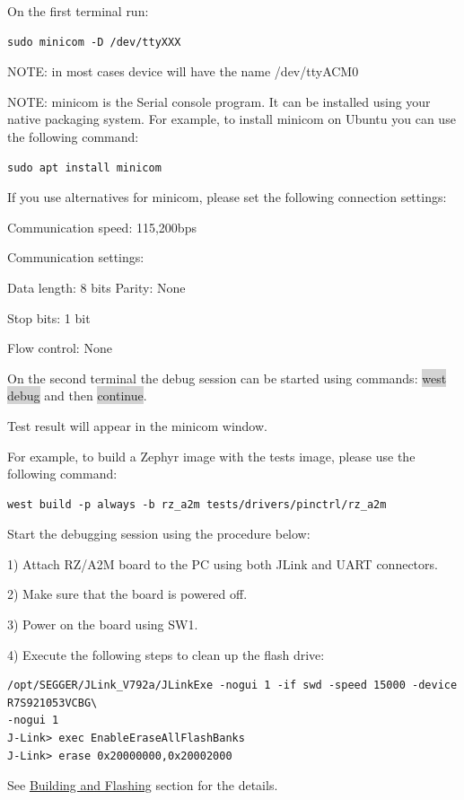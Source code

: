 \documentclass[11pt,a4paper,oneside]{article}
\begin{document}
On the first terminal run:
\begin{lstlisting}
sudo minicom -D /dev/ttyXXX
\end{lstlisting}

NOTE: in most cases device will have the name /dev/ttyACM0

NOTE: minicom is the Serial console program. It can be installed using
your native packaging system. For example, to install minicom on Ubuntu
you can use the following command:

\begin{lstlisting}
sudo apt install minicom
\end{lstlisting}

If you use alternatives for minicom, please set the following connection
settings:

Communication speed: 115,200bps

Communication settings:

Data length: 8 bits
Parity: None

Stop bits: 1 bit

Flow control: None

On the second terminal the debug session can be started using commands:
\colorbox{lightgray}{west debug} and then \colorbox{lightgray}{continue}.

Test result will appear in the minicom window.

For example, to build a Zephyr image with the tests image, please use
the following command:

\begin{lstlisting}
west build -p always -b rz_a2m tests/drivers/pinctrl/rz_a2m
\end{lstlisting}

Start the debugging session using the procedure below:

1) Attach RZ/A2M board to the PC using both JLink and UART connectors.

2) Make sure that the board is powered off.

3) Power on the board using SW1.

4) Execute the following steps to clean up the flash drive:

\begin{lstlisting}
/opt/SEGGER/JLink_V792a/JLinkExe -nogui 1 -if swd -speed 15000 -device R7S921053VCBG\
-nogui 1
J-Link> exec EnableEraseAllFlashBanks
J-Link> erase 0x20000000,0x20002000
\end{lstlisting}

See \hyperref[building-and-flashing]{Building and Flashing} section
for the details.
\end{document}
